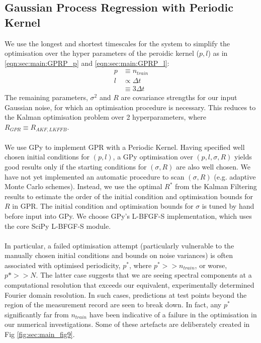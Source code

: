\subsection{Gaussian Process Regression with Periodic Kernel}

We use the longest and shortest timescales for the system to simplify the optimisation over the hyper parameters of the peroidic kernel ($p, l$) as in \eqref{eqn:sec:main:GPRP_p} and \eqref{eqn:sec:main:GPRP_l}:
\begin{align}
p & \equiv n_{train} \\ 
l & \propto  \Delta t \\
& \equiv 3 \Delta t
\end{align}
The remaining parameters, $\sigma^2$ and $R$ are covariance strengths for our input Gaussian noise, for which an optimisation procedure is necessary. This reduces to the Kalman optimisation problem over 2 hyperparameters, where $R_{GPR} \equiv R_{AKF, LKFFB}$.
\\
\\
We use GPy \cite{gpy2014} to implement GPR with a Periodic Kernel. Having specified well chosen initial conditions for $(p,l)$, a GPy optimisation over $(p, l, \sigma, R)$ yields good results only if the starting conditions for $(\sigma, R)$ are also well chosen. We have not yet implemented an automatic procedure to scan $(\sigma, R)$ (e.g. adaptive Monte Carlo schemes).  Instead, we use the optimal $R^*$ from the Kalman Filtering results to estimate the order of the initial condition and optimisation bounds for $R$ in GPR. The initial condition and optimisation bounds for $\sigma$ is tuned by hand before input into GPy. We choose GPy's L-BFGF-S implementation, which uses the core SciPy L-BFGF-S module. 
\\
\\
In particular, a failed optimisation attempt (particularly vulnerable to the manually chosen initial conditions and bounds on noise variances) is often associated with optimised periodicity, $p^*$, where $p^* >> n_{train}$, or worse, $p* >> N$. The latter case suggests that we are seeing spectral components at a computational resolution that exceeds our equivalent, experimentally determined Fourier domain resolution. In such cases, predictions at test points beyond the region of the measurement record are seen to break down. In fact, any $p^*$ significantly far from $n_{train}$ have been indicative of a failure in the optimisation in our numerical investigations. Some of these artefacts are deliberately created in Fig \ref{fig:sec:main_fig9}.


